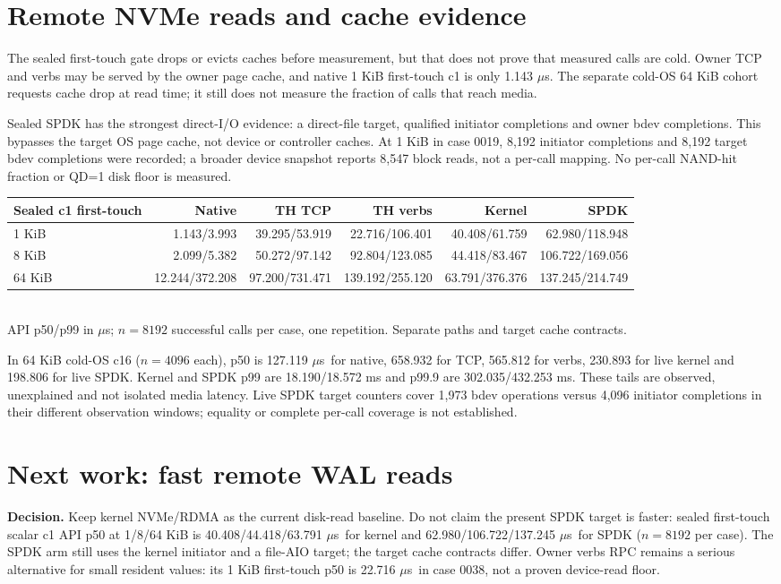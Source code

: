 \documentclass[10pt,a4paper]{article}
\newcommand{\us}{$\mu$s}
\begin{document}
\section{Remote NVMe reads and cache evidence}
The sealed first-touch gate drops or evicts caches before measurement, but that does not prove that measured calls are cold. Owner TCP and verbs may be served by the owner page cache, and native 1 KiB first-touch c1 is only 1.143 \us. The separate cold-OS 64 KiB cohort requests cache drop at read time; it still does not measure the fraction of calls that reach media.

Sealed SPDK has the strongest direct-I/O evidence: a direct-file target, qualified initiator completions and owner bdev completions. This bypasses the target OS page cache, not device or controller caches. At 1 KiB in case 0019, 8,192 initiator completions and 8,192 target bdev completions were recorded; a broader device snapshot reports 8,547 block reads, not a per-call mapping. No per-call NAND-hit fraction or QD=1 disk floor is measured.

\begin{center}\small
\begin{tabular}{lrrrrr}\toprule
Sealed c1 first-touch & Native & TH TCP & TH verbs & Kernel & SPDK\\\midrule
1 KiB & 1.143/3.993 & 39.295/53.919 & 22.716/106.401 & 40.408/61.759 & 62.980/118.948\\
8 KiB & 2.099/5.382 & 50.272/97.142 & 92.804/123.085 & 44.418/83.467 & 106.722/169.056\\
64 KiB & 12.244/372.208 & 97.200/731.471 & 139.192/255.120 & 63.791/376.376 & 137.245/214.749\\\bottomrule
\end{tabular}\\[2pt]
API p50/p99 in \us; $n=8192$ successful calls per case, one repetition. Separate paths and target cache contracts.
\end{center}
In 64 KiB cold-OS c16 ($n=4096$ each), p50 is 127.119 \us\ for native, 658.932 for TCP, 565.812 for verbs, 230.893 for live kernel and 198.806 for live SPDK. Kernel and SPDK p99 are 18.190/18.572 ms and p99.9 are 302.035/432.253 ms. These tails are observed, unexplained and not isolated media latency. Live SPDK target counters cover 1,973 bdev operations versus 4,096 initiator completions in their different observation windows; equality or complete per-call coverage is not established.

\section{Next work: fast remote WAL reads}
\textbf{Decision.} Keep kernel NVMe/RDMA as the current disk-read baseline. Do not claim the present SPDK target is faster: sealed first-touch scalar c1 API p50 at 1/8/64 KiB is 40.408/44.418/63.791 \us\ for kernel and 62.980/106.722/137.245 \us\ for SPDK ($n=8192$ per case). The SPDK arm still uses the kernel initiator and a file-AIO target; the target cache contracts differ. Owner verbs RPC remains a serious alternative for small resident values: its 1 KiB first-touch p50 is 22.716 \us\ in case 0038, not a proven device-read floor.
\end{document}
